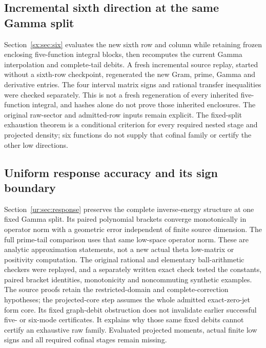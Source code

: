 \documentclass[11pt,a4paper]{article}
\numberwithin{equation}{section}
\theoremstyle{definition}\newtheorem{definition}[theorem]{Definition}
\theoremstyle{remark}\newtheorem{remark}[theorem]{Remark}
\begin{document}
\subsection{Incremental sixth direction at the same Gamma split}
Section~\ref{sx:sec:six} evaluates the new sixth row and column while
retaining frozen enclosing five-function integral blocks, then recomputes
the current Gamma interpolation and complete-tail debits. A fresh
incremental source replay, started without a sixth-row checkpoint,
regenerated the new Gram, prime, Gamma and derivative entries. The four
interval matrix signs and rational transfer inequalities were checked
separately. This is not a fresh regeneration of every inherited
five-function integral, and hashes alone do not prove those inherited
enclosures. The original raw-sector and admitted-row inputs remain
explicit. The fixed-split exhaustion theorem is a conditional criterion
for every required nested stage and projected density; six functions do
not supply that cofinal family or certify the other low directions.


\subsection{Uniform response accuracy and its sign boundary}
Section~\ref{ur:sec:response} preserves the complete inverse-energy
structure at one fixed Gamma split. Its paired polynomial brackets
converge monotonically in operator norm with a geometric error independent
of finite source dimension. The full prime-tail comparison uses that same
low-space operator norm. These are analytic approximation statements,
not a new actual theta low-matrix or positivity computation. The original
rational and elementary ball-arithmetic checkers were replayed, and a
separately written exact check tested the constants, paired bracket
identities, monotonicity and noncommuting synthetic examples. The source
proofs retain the restricted-domain and complete-correction hypotheses;
the projected-core step assumes the whole admitted exact-zero-jet form
core. Its fixed graph-debit obstruction does not invalidate earlier
successful five- or six-mode certificates. It explains why those same
fixed debits cannot certify an exhaustive raw family. Evaluated projected
moments, actual finite low signs and all required cofinal stages remain
missing.
\end{document}
